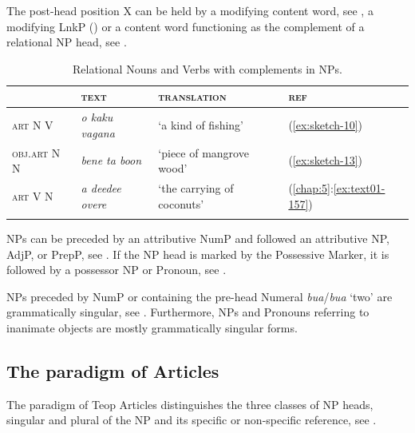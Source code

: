 \documentclass[output=paper]{langscibook}
\begin{document}
The post-head position X can be held by a modifying content word, see , a modifying LnkP () or a content word functioning as the complement of a relational NP head, see .


\begin{table}
    \caption{Relational Nouns and Verbs with complements in NPs.} \label{tab:relnoun}
\begin{tabularx}{\textwidth}{llll}
    \lsptoprule
    &\textsc{text}&\textsc{translation}&\textsc{ref}\\
    \midrule
        \textsc{art} N V&\textit{o kaku vagana}&`a kind of fishing'&(\ref{ex:sketch-10})\\
        \textsc{obj}.\textsc{art} N N&\textit{bene ta boon}&`piece of mangrove wood'&(\ref{ex:sketch-13})\\
        \textsc{art} V N&\textit{a deedee overe}&`the carrying of coconuts'&(\ref{chap:5}:\ref{ex:text01-157})\\
    \lspbottomrule
\end{tabularx}
\end{table}


NPs can be preceded by an attributive NumP and followed an attributive NP, AdjP, or PrepP, see . If the NP head is marked by the Possessive Marker, it is followed by a possessor NP or Pronoun, see .

NPs preceded by NumP or containing the pre-head Numeral \textit{bua}/\textit{bua} `two' are grammatically singular, see . Furthermore, NPs and Pronouns referring to inanimate objects are mostly grammatically singular forms.

\subsection{The paradigm of Articles}\label{sec:paraarticles}

The paradigm of Teop Articles distinguishes the three classes of NP heads, singular and plural of the NP and its specific or non-specific reference, see .
\end{document}

